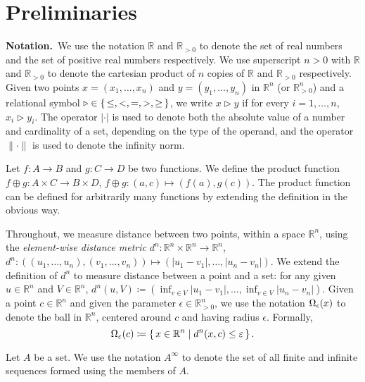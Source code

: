 
\section{Preliminaries}

\smallskip
\noindent\textbf{Notation.}\
We use the notation $\mathbb{R}$ and $\mathbb{R}_{>0}$ to denote the set of real numbers and the set of positive real numbers respectively.
We use superscript $n>0$ with $\mathbb{R}$ and $\mathbb{R}_{>0}$ to denote the cartesian product of $n$ copies of $\mathbb{R}$ and $\mathbb{R}_{>0}$ respectively.
Given two points $x=(x_1,\ldots, x_n)$ and $y=(y_1,\ldots, y_n)$ in $ \mathbb{R}^n$ (or $\mathbb{R}^n_{>0}$) and a relational symbol $\triangleright\in \set{\leq, <, = , >, \geq}$, we write $x\triangleright y$ if for every $i=1,\ldots,n$, $x_i\triangleright y_i$.
The operator $|\cdot |$ is used to denote both the absolute value of a number and cardinality of a set, depending on the type of the operand, and the operator $\| \cdot \|$ is used to denote the infinity norm.  

Let $f\colon A\to B$ and $g\colon C\to D$ be two functions.
We define the product function $f\oplus g\colon A\times C\to B\times D $, $f\oplus g \colon (a,c)\mapsto (f(a),g(c))$.
The product function can be defined for arbitrarily many functions by extending the definition in the obvious way.

Throughout, we measure distance between two points, within a space $\mathbb{R}^n$, using the \emph{element-wise distance metric} $d^n\colon \mathbb{R}^n\times \mathbb{R}^n\to \mathbb{R}^n$, $d^n\colon \left((u_1,\ldots, u_n),(v_1,\ldots,v_n)\right)\mapsto \left(|u_1-v_1|,\ldots,|u_n-v_n|\right)$. 
We extend the definition of $d^n$ to measure distance between a point and a set: for any given $u\in \mathbb{R}^n$ and $V\in \mathbb{R}^n$, $d^n(u,V) \coloneqq \left( \inf_{v\in V}|u_1-v_1|,\ldots, \inf_{v\in V}|u_n-v_n| \right)$.
Given a point $c\in \mathbb{R}^n$ and given the parameter $\epsilon\in \mathbb{R}_{>0}^{n}$, we use the notation $\Omega_\epsilon( x)$ to denote the ball in $\mathbb{R}^n$, centered around $c$ and having radius $\epsilon$.
Formally, \[\Omega_\varepsilon(c)\coloneqq \set{x
	\in \mathbb{R}^n \mid  d^n(x,c)\leq \varepsilon }.\] 

Let $A$ be a set.
We use the notation $A^\infty$ to denote the set of all finite and infinite sequences formed using the members of $A$.


